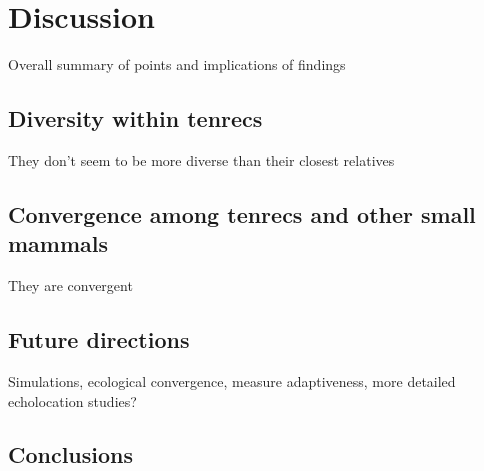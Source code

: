 \chapter{Discussion}
\label{chap:discussion}



\noindent
Overall summary of points and implications of findings

\section{Diversity within tenrecs}
They don't seem to be more diverse than their closest relatives



\section{Convergence among tenrecs and other small mammals}
They are convergent

\section{Future directions}
Simulations, ecological convergence, measure adaptiveness, more detailed echolocation studies?

\section{Conclusions}



